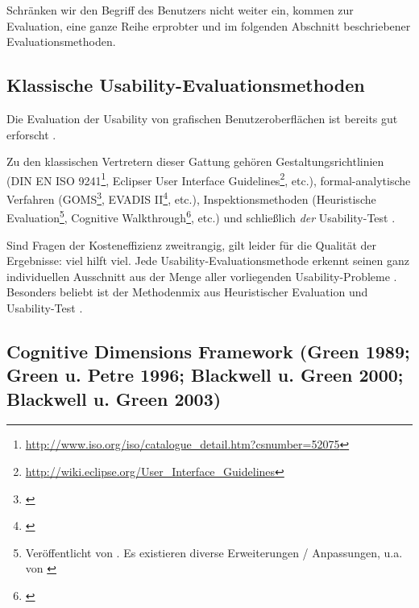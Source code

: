 Schränken wir den Begriff des Benutzers nicht weiter ein, kommen zur Evaluation, eine ganze Reihe erprobter und im folgenden Abschnitt beschriebener Evaluationsmethoden.

\subsection{Klassische Usability-Evaluationsmethoden}
\label{sec:literatur-klassische-usability-evaluation}

Die Evaluation der Usability von grafischen Benutzeroberflächen ist bereits gut erforscht \citep{Kahlert:2011wr}.

Zu den klassischen Vertretern dieser Gattung gehören Gestaltungsrichtlinien (DIN EN ISO 9241\footnote{\url{http://www.iso.org/iso/catalogue_detail.htm?csnumber=52075}}, Eclipser User Interface Guidelines\footnote{\url{http://wiki.eclipse.org/User_Interface_Guidelines}}, etc.), formal-analytische Verfahren (GOMS\footnote{\cite{Card:1983:PHI:578027}}, EVADIS II\footnote{\cite{Oppermann1992Evalu-26396}}, etc.), Inspektionsmethoden (Heuristische Evaluation\footnote{Veröffentlicht von \cite{Nielsen:1990bw}. Es existieren diverse Erweiterungen / Anpassungen, u.a. von \cite{Sarodnick:2006vc}}, Cognitive Walkthrough\footnote{\cite{Wharton:1994to}}, etc.) und schließlich \textit{der} Usability-Test \citep{Faulkner:2003wn}.

Sind Fragen der Kosteneffizienz zweitrangig, gilt leider für die Qualität der Ergebnisse: viel hilft viel. Jede Usability-Evaluationsmethode erkennt seinen ganz individuellen Ausschnitt aus der Menge aller vorliegenden Usability-Probleme \citep{Sarodnick:2006vc,Kahlert:2011wr,Nielsen:2005uv,Fu:2002tp}. Besonders beliebt ist der Methodenmix aus Heuristischer Evaluation und Usability-Test \citep{Fu:2002tp}.


\subsection{Cognitive Dimensions Framework (Green 1989; Green u. Petre 1996; Blackwell u. Green 2000; Blackwell u. Green 2003)}
\label{sec:cdf}

